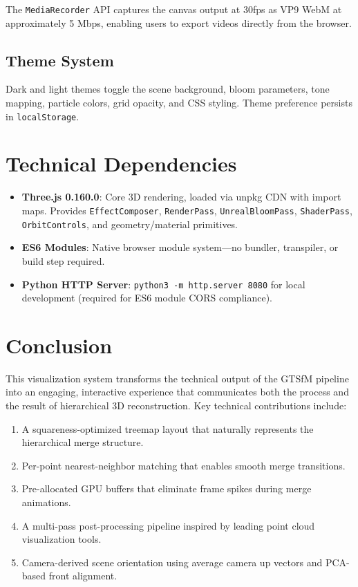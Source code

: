 \documentclass[11pt, letterpaper]{article}
\begin{document}
The \texttt{MediaRecorder} API captures the canvas output at 30fps as VP9 WebM at approximately 5 Mbps, enabling users to export videos directly from the browser.

\subsection{Theme System}

Dark and light themes toggle the scene background, bloom parameters, tone mapping, particle colors, grid opacity, and CSS styling. Theme preference persists in \texttt{localStorage}.

\section{Technical Dependencies}

\begin{itemize}
    \item \textbf{Three.js 0.160.0}: Core 3D rendering, loaded via unpkg CDN with import maps. Provides \texttt{EffectComposer}, \texttt{RenderPass}, \texttt{UnrealBloomPass}, \texttt{ShaderPass}, \texttt{OrbitControls}, and geometry/material primitives.
    \item \textbf{ES6 Modules}: Native browser module system---no bundler, transpiler, or build step required.
    \item \textbf{Python HTTP Server}: \texttt{python3 -m http.server 8080} for local development (required for ES6 module CORS compliance).
\end{itemize}

\section{Conclusion}

This visualization system transforms the technical output of the GTSfM pipeline into an engaging, interactive experience that communicates both the process and the result of hierarchical 3D reconstruction. Key technical contributions include:

\begin{enumerate}
    \item A squareness-optimized treemap layout that naturally represents the hierarchical merge structure.
    \item Per-point nearest-neighbor matching that enables smooth merge transitions.
    \item Pre-allocated GPU buffers that eliminate frame spikes during merge animations.
    \item A multi-pass post-processing pipeline inspired by leading point cloud visualization tools.
    \item Camera-derived scene orientation using average camera up vectors and PCA-based front alignment.
\end{enumerate}
\end{document}
